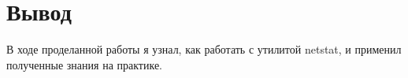 \chapter{Вывод}
\label{ch:chap3}

В ходе проделанной работы я узнал, как работать с утилитой netstat, и применил полученные знания на практике.
\endinput